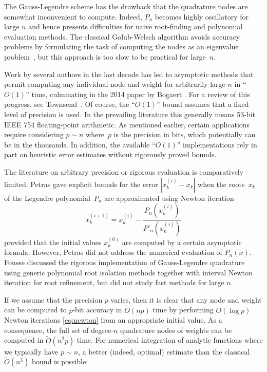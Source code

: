 \documentclass[11pt,a4paper]{article}
\begin{document}
The Gauss-Legendre scheme has the drawback
that the quadrature nodes are
somewhat inconvenient to compute.
Indeed, $P_n$ becomes highly oscillatory for
large $n$ and hence presents difficulties
for naive root-finding and polynomial evaluation methods.
The classical Golub-Welsch algorithm avoids accuracy problems
by formulating the task of computing the nodes as an eigenvalue problem~\cite{golub1969calculation},
but this approach is too slow to be practical for large~$n$.

Work by several authors in the last decade has led to asymptotic methods
that permit computing any individual node and weight for arbitrarily large $n$
in ``$O(1)$'' time, culminating in the 2014 paper by Bogaert \cite{bogaert2014iteration}.
For a review of this progress, see Townsend~\cite{townsend2015race}.
Of course, the ``$O(1)$'' bound assumes that a fixed
level of precision is used. In the prevailing literature
this generally means 53-bit IEEE 754 floating-point arithmetic.
As mentioned earlier, certain applications require
considering $p \sim n$ where~$p$ is the precision in bits,
which potentially can be in the thousands.
In addition, the available ``$O(1)$'' implementations rely in part
on heuristic error estimates without rigorously proved bounds.

The literature on arbitrary precision or rigorous evaluation
is comparatively limited.
Petras \cite{petras1999computation} gave explicit
bounds for the error $|x_k^{(i)} - x_k|$ when
the roots $x_k$ of the Legendre polynomial $P_n$
are approximated using Newton iteration
\begin{equation}
\label{eq:newton}
x^{(i+1)}_k = x^{(i)}_k - \frac{P_n(x^{(i)}_k)}{P'_n(x^{(i)}_k)}
\end{equation}
provided that the initial values $x^{(0)}_k$
are computed by a certain asymptotic formula.
However, Petras did not address the numerical evaluation of $P_n(x)$.
Fousse \cite{fousse2007accurate} discussed the rigorous implementation
of Gauss-Legendre quadrature
using generic polynomial root isolation methods together with
interval Newton iteration
for root refinement,
but did not study fast methods for large $n$.

If we assume that the precision $p$ varies,
then it is clear that any node and weight
can be computed to $p$-bit accuracy in $\widetilde{O}(n p)$ time
by performing $O(\log p)$ Newton iterations \eqref{eq:newton}
from an appropriate initial value.
As a consequence, the
full set of degree-$n$ quadrature nodes of weights
can be computed in $\widetilde{O}(n^2 p)$ time.
For numerical integration of analytic functions
where we typically have $p \sim n$, a better (indeed, optimal) estimate
than the classical $\widetilde{O}(n^3)$ bound is possible:
\end{document}
